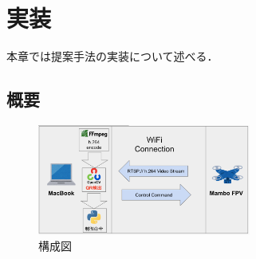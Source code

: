\chapter{実装}
\label{implementation}

本章では提案手法の実装について述べる．

\section{概要}
\begin{figure}[htbp]
  \begin{center}
    \includegraphics[clip,width=7.0cm]{img/sys-struct.png}
    \caption{構成図}
    \label{fig:struct}
  \end{center}
\end{figure}



